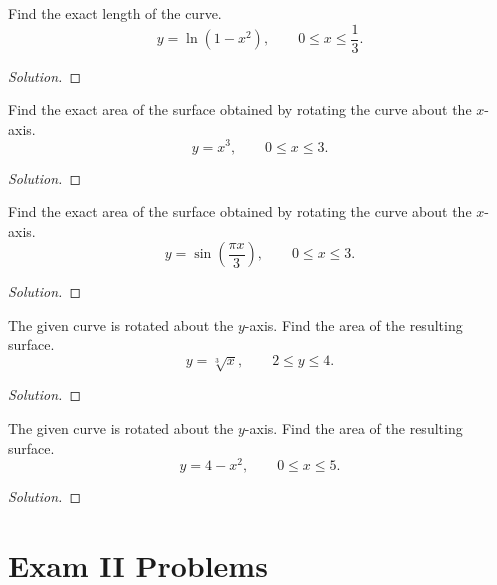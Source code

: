 \begin{problem}[WebAssign, HW 17, \# 4]
Find the exact length of the curve.
\[
y=\ln\left(1-x^2\right),\qquad 0\leq x\leq\frac{1}{3}.
\]
\end{problem}
\begin{proof}[Solution]
\end{proof}

\begin{problem}[WebAssign, HW 17, \# 5]
Find the exact area of the surface obtained by rotating the curve about the
$x$-axis.
\[
y=x^3,\qquad 0\leq x\leq 3.
\]
\end{problem}
\begin{proof}[Solution]
\end{proof}

\begin{problem}[WebAssign, HW 17, \# 6]
Find the exact area of the surface obtained by rotating the curve about the
$x$-axis.
\[
y=\sin\left(\frac{\pi x}{3}\right),\qquad 0\leq x\leq 3.
\]
\end{problem}
\begin{proof}[Solution]
\end{proof}

\begin{problem}[WebAssign, HW 17, \# 7]
The given curve is rotated about the $y$-axis. Find the area of the
resulting surface.
\[
y=\sqrt[3]{x},\qquad 2\leq y\leq 4.
\]
\end{problem}
\begin{proof}[Solution]
\end{proof}

\begin{problem}[WebAssign, HW 17, \# 8]
The given curve is rotated about the $y$-axis. Find the area of the
resulting surface.
\[
  y=4-x^2,\qquad 0\leq x\leq 5.
\]
\end{problem}
\begin{proof}[Solution]
\end{proof}

\chapter{Exam II Problems}

